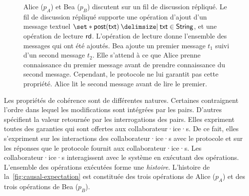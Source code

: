 
\begin{figure}[htb]
\centering
{}
\caption[Attentes des collaborateur·ice·s]{Alice ($p_A$) et Bea ($p_B$) discutent sur un fil de discussion répliqué.
Le fil de discussion répliqué supporte une opération d'ajout d'un message textuel $\set*{\trm{post}(\trm{txt}) \given \trm{txt} \in \trm{String} }$, et une opération de lecture $\operatorname{\mathsf{rd}}$.
L'opération de lecture donne l'ensemble des messages qui ont été ajoutés.
Bea ajoute un premier message $t_1$ suivi d'un second message $t_2$.
Elle s'attend à ce que Alice prenne connaissance du premier message avant de prendre connaissance du second message.
Cependant, le protocole ne lui garantit pas cette propriété.
Alice lit le second message avant de lire le premier.}\label{fig:causal-expectation}
\end{figure}

Les propriétés de cohérence sont de différentes natures.
Certaines contraignent l'ordre dans lequel les modifications sont intégrées par les pairs.
D'autres spécifient la valeur retournée par les interrogations des pairs.
Elles expriment toutes des garanties qui sont offertes aux collaborateur·ice·s.
De ce fait, elles s'expriment sur les interactions des collaborateur·ice·s avec le protocole et sur les réponses que le protocole fournit aux collaborateur·ice·s.
Les collaborateur·ice·s interagissent avec le système en exécutant des opérations.
L'ensemble des opérations exécutées forme une \emph{histoire}.
L'histoire de la~\autoref{fig:causal-expectation} est constituée des trois opérations de Alice ($p_A$) et des trois opérations de Bea ($p_B$).


